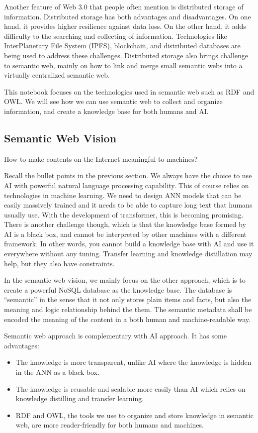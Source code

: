 Another feature of Web 3.0 that people often mention is distributed storage of information. Distributed storage has both advantages and disadvantages. On one hand, it provides higher resilience against data loss. On the other hand, it adds difficulty to the searching and collecting of information. Technologies like InterPlanetary File System (IPFS), blockchain, and distributed databases are being used to address these challenges. Distributed storage also brings challenge to semantic web, mainly on how to link and merge small semantic webs into a virtually centralized semantic web.

This notebook focuses on the technologies used in semantic web such as RDF and OWL. We will see how we can use semantic web to collect and organize information, and create a knowledge base for both humans and AI.

\subsection{Semantic Web Vision}

How to make contents on the Internet meaningful to machines?

Recall the bullet points in the previous section. We always have the choice to use AI with powerful natural language processing capability. This of course relies on technologies in machine learning. We need to design ANN models that can be easily massively trained and it needs to be able to capture long text that humans usually use. With the development of transformer, this is becoming promising. There is another challenge though, which is that the knowledge base formed by AI is a black box, and cannot be interpreted by other machines with a different framework. In other words, you cannot build a knowledge base with AI and use it everywhere without any tuning. Transfer learning and knowledge distillation may help, but they also have constraints.

In the semantic web vision, we mainly focus on the other approach, which is to create a powerful NoSQL database as the knowledge base. The database is ``semantic'' in the sense that it not only stores plain items and facts, but also the meaning and logic relationship behind the them. The semantic metadata shall be encoded the meaning of the content in a both human and machine-readable way.

Semantic web approach is complementary with AI approach. It has some advantages:
\begin{itemize}
  \item The knowledge is more transparent, unlike AI where the knowledge is hidden in the ANN as a black box.
  \item The knowledge is reusable and scalable more easily than AI which relies on knowledge distilling and transfer learning.
  \item RDF and OWL, the tools we use to organize and store knowledge in semantic web, are more reader-friendly for both humans and machines.
\end{itemize}

